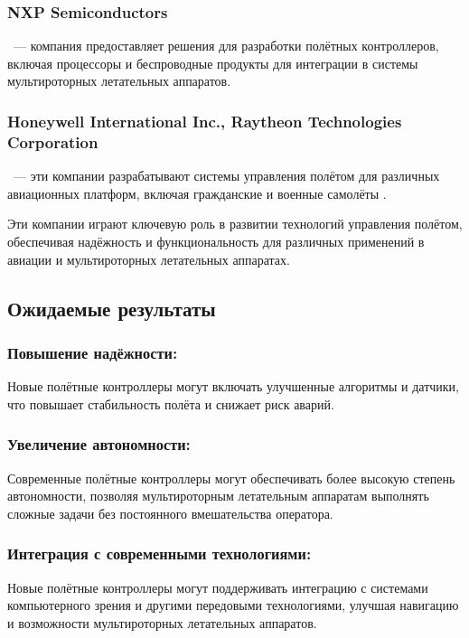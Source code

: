 \documentclass[a4paper]{bsuir-tor}
\begin{document}
   \subsubsection*{NXP Semiconductors} \ — компания предоставляет
   решения для разработки полётных контроллеров, включая процессоры и
   беспроводные продукты для интеграции в системы мультироторных
   летательных аппаратов.

   \subsubsection*{Honeywell International Inc., Raytheon Technologies
     Corporation} \
   — эти компании разрабатывают системы управления полётом для различных
   авиационных платформ, включая гражданские и военные самолёты .

  Эти компании играют ключевую роль в развитии технологий управления
  полётом, обеспечивая надёжность и функциональность для различных
  применений в авиации и мультироторных летательных аппаратах.
  
  
  \subsection{Ожидаемые результаты}
  
  \subsubsection{Повышение надёжности: }
  Новые полётные контроллеры могут включать улучшенные алгоритмы и
  датчики, что повышает стабильность полёта и снижает риск аварий.
  
  \subsubsection{Увеличение автономности: }
  Современные полётные контроллеры могут обеспечивать более высокую
  степень автономности, позволяя мультироторным летательным аппаратам
  выполнять сложные задачи без постоянного вмешательства оператора.

  \subsubsection{Интеграция с современными технологиями: }
  Новые полётные контроллеры могут поддерживать интеграцию с системами
  компьютерного зрения и другими передовыми технологиями, улучшая
  навигацию и возможности мультироторных летательных аппаратов.
  
\end{document}
